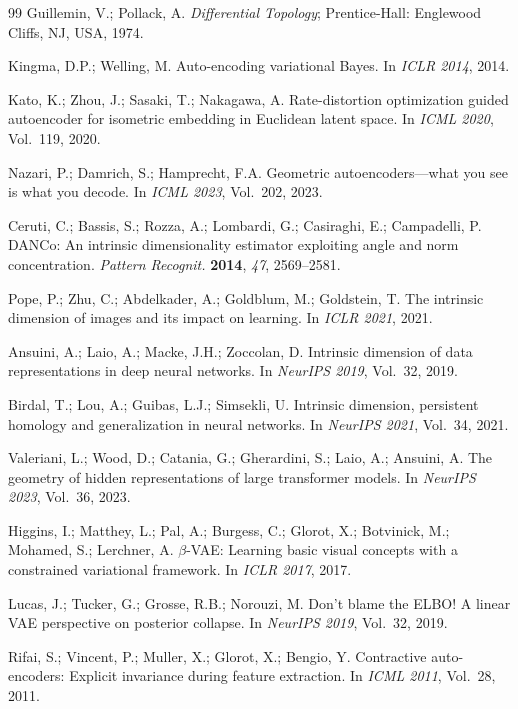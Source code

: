 \documentclass[make,article,submit,pdftex,moreauthors]{Definitions/mdpi}
\begin{document}
\begin{thebibliography}{99}
Guillemin, V.; Pollack, A. \textit{Differential Topology};
Prentice-Hall: Englewood Cliffs, NJ, USA, 1974.

Kingma, D.P.; Welling, M.
Auto-encoding variational Bayes.
In \textit{ICLR 2014}, 2014.

Kato, K.; Zhou, J.; Sasaki, T.; Nakagawa, A.
Rate-distortion optimization guided autoencoder for isometric embedding in Euclidean latent space.
In \textit{ICML 2020}, Vol.~119, 2020.

Nazari, P.; Damrich, S.; Hamprecht, F.A.
Geometric autoencoders---what you see is what you decode.
In \textit{ICML 2023}, Vol.~202, 2023.

Ceruti, C.; Bassis, S.; Rozza, A.; Lombardi, G.; Casiraghi, E.; Campadelli, P.
DANCo: An intrinsic dimensionality estimator exploiting angle and norm concentration.
\textit{Pattern Recognit.} \textbf{2014}, \textit{47}, 2569--2581.

Pope, P.; Zhu, C.; Abdelkader, A.; Goldblum, M.; Goldstein, T.
The intrinsic dimension of images and its impact on learning.
In \textit{ICLR 2021}, 2021.

Ansuini, A.; Laio, A.; Macke, J.H.; Zoccolan, D.
Intrinsic dimension of data representations in deep neural networks.
In \textit{NeurIPS 2019}, Vol.~32, 2019.

Birdal, T.; Lou, A.; Guibas, L.J.; Simsekli, U.
Intrinsic dimension, persistent homology and generalization in neural networks.
In \textit{NeurIPS 2021}, Vol.~34, 2021.

Valeriani, L.; Wood, D.; Catania, G.; Gherardini, S.; Laio, A.; Ansuini, A.
The geometry of hidden representations of large transformer models.
In \textit{NeurIPS 2023}, Vol.~36, 2023.

Higgins, I.; Matthey, L.; Pal, A.; Burgess, C.; Glorot, X.; Botvinick, M.;
Mohamed, S.; Lerchner, A.
$\beta$-VAE: Learning basic visual concepts with a constrained variational framework.
In \textit{ICLR 2017}, 2017.

Lucas, J.; Tucker, G.; Grosse, R.B.; Norouzi, M.
Don't blame the ELBO! A linear VAE perspective on posterior collapse.
In \textit{NeurIPS 2019}, Vol.~32, 2019.

Rifai, S.; Vincent, P.; Muller, X.; Glorot, X.; Bengio, Y.
Contractive auto-encoders: Explicit invariance during feature extraction.
In \textit{ICML 2011}, Vol.~28, 2011.


\end{thebibliography}
\end{document}
